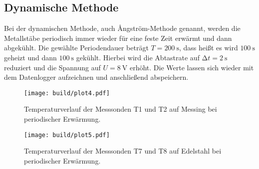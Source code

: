 \subsection{Dynamische Methode}
Bei der dynamischen Methode, auch Ångström-Methode genannt, werden die Metallstäbe periodisch immer wieder für eine feste Zeit erwärmt und dann abgekühlt. Die gewählte Periodendauer beträgt $T = \SI{200}{\second}$, dass heißt es wird $\SI{100}{\second}$ geheizt und dann $\SI{100}{\second}$ gekühlt.  Hierbei wird die Abtastrate auf $\increment t = \SI{2}{\second}$ reduziert und die Spannung auf $U = \SI{8}{\volt}$ erhöht.
Die Werte lassen sich wieder mit dem Datenlogger aufzeichnen und anschließend abspeichern.


\begin{figure}
    \centering
    \texttt{[image: build/plot4.pdf]}
    \caption{Temperaturverlauf der Messsonden T1 und T2 auf Messing bei periodischer Erwärmung.} 
    \label{fig:plot4}
\end{figure}


\begin{figure}
    \centering
    \texttt{[image: build/plot5.pdf]}
    \caption{Temperaturverlauf der Messsonden T7 und T8 auf Edelstahl bei periodischer Erwärmung.} 
    \label{fig:plot5}
\end{figure}